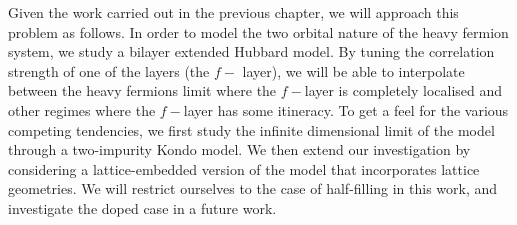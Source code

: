 \documentclass[%
reprint,
superscriptaddress,
groupedaddress,
superscriptaddress,
onecolumn,
10pt
]{revtex4-2}
\begin{document}
Given the work carried out in the previous chapter, we will approach this problem as follows. In order to model the two orbital nature of the heavy fermion system, we study a bilayer extended Hubbard model. By tuning the correlation strength of one of the layers (the \(f-\) layer), we will be able to interpolate between the heavy fermions limit where the \(f-\)layer is completely localised and other regimes where the \(f-\)layer has some itineracy. To get a feel for the various competing tendencies, we first study the infinite dimensional limit of the model through a two-impurity Kondo model. We then extend our investigation by considering a lattice-embedded version of the model that incorporates lattice geometries. We will restrict ourselves to the case of half-filling in this work, and investigate the doped case in a future work.
\end{document}
